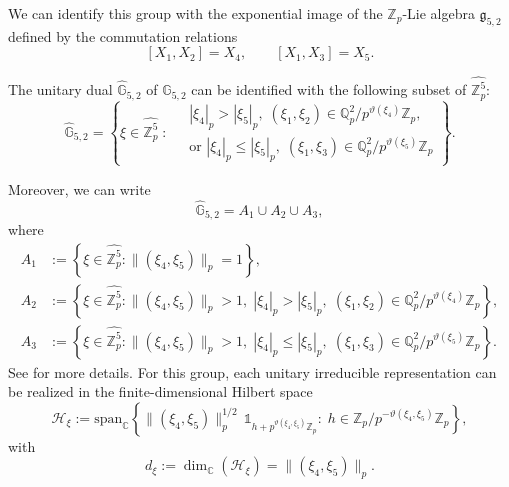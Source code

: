 \documentclass[12pt, reqno]{amsart}
\newcommand{\1}{\mathds{1}}
\begin{document}
We can identify this group with the exponential image of the $\mathbb{Z}_p$-Lie algebra $\mathfrak{g}_{5,2}$ defined by the commutation relations
\[
[X_1, X_2] = X_4, \qquad [X_1, X_3] = X_5.
\]

The unitary dual $\widehat{\mathbb{G}}_{5,2}$ of $\mathbb{G}_{5,2}$ can be identified with the following subset of $\widehat{\mathbb{Z}_p^5}$:
\[
\widehat{\mathbb{G}}_{5,2}
=
\left\{
\xi \in \widehat{\mathbb{Z}_p^5} \;:\;
\begin{aligned}
&|\xi_4|_p > |\xi_5|_p,\; (\xi_1,\xi_2) \in \mathbb{Q}_p^2 / p^{\vartheta(\xi_4)}\mathbb{Z}_p, \\
&\text{or } |\xi_4|_p \leq |\xi_5|_p,\; (\xi_1,\xi_3) \in \mathbb{Q}_p^2 / p^{\vartheta(\xi_5)}\mathbb{Z}_p
\end{aligned}
\right\}.
\]

Moreover, we can write
\[
\widehat{\mathbb{G}}_{5,2} = A_1 \cup A_2 \cup A_3,
\]
where
\begin{align*}
A_1 &:= \left\{ \xi \in \widehat{\mathbb{Z}_p^5} : \|(\xi_4,\xi_5)\|_p = 1 \right\}, \\
A_2 &:= \left\{ \xi \in \widehat{\mathbb{Z}_p^5} :
\|(\xi_4,\xi_5)\|_p > 1,\;
|\xi_4|_p > |\xi_5|_p,\;
(\xi_1,\xi_2) \in \mathbb{Q}_p^2 / p^{\vartheta(\xi_4)}\mathbb{Z}_p
\right\}, \\
A_3 &:= \left\{ \xi \in \widehat{\mathbb{Z}_p^5} :
\|(\xi_4,\xi_5)\|_p > 1,\;
|\xi_4|_p \leq |\xi_5|_p,\;
(\xi_1,\xi_3) \in \mathbb{Q}_p^2 / p^{\vartheta(\xi_5)}\mathbb{Z}_p
\right\}.
\end{align*}
See \cite{VelasquezRodriguez2025} for more details. For this group, each unitary irreducible representation can be realized in the finite-dimensional Hilbert space
\[
\mathcal{H}_\xi
:=
\mathrm{span}_{\mathbb{C}}
\left\{
\|(\xi_4,\xi_5)\|_p^{1/2}
\, \1_{h + p^{\vartheta(\xi_4,\xi_5)}\mathbb{Z}_p}
:\;
h \in \mathbb{Z}_p / p^{-\vartheta(\xi_4,\xi_5)}\mathbb{Z}_p
\right\},
\]
with
\[
d_\xi := \dim_{\mathbb{C}}(\mathcal{H}_\xi) = \|(\xi_4,\xi_5)\|_p.
\]
\end{document}
